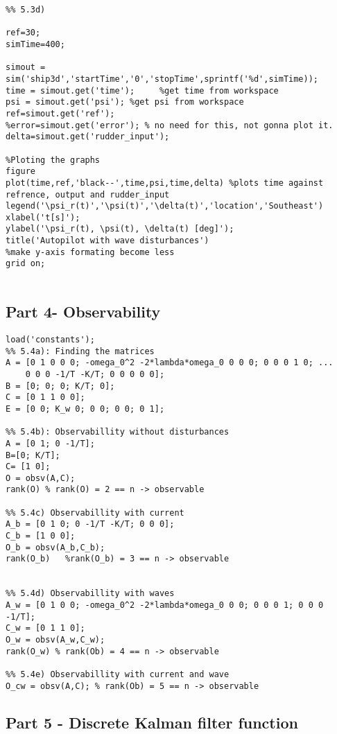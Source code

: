 \begin{lstlisting}
%% 5.3d)

ref=30;
simTime=400; 

simout = sim('ship3d','startTime','0','stopTime',sprintf('%d',simTime));
time = simout.get('time');     %get time from workspace
psi = simout.get('psi'); %get psi from workspace
ref=simout.get('ref');
%error=simout.get('error'); % no need for this, not gonna plot it.
delta=simout.get('rudder_input');

%Ploting the graphs
figure
plot(time,ref,'black--',time,psi,time,delta) %plots time against refrence, output and rudder_input
legend('\psi_r(t)','\psi(t)','\delta(t)','location','Southeast')
xlabel('t[s]');
ylabel('\psi_r(t), \psi(t), \delta(t) [deg]'); 
title('Autopilot with wave disturbances')
%make y-axis formating become less
grid on;


\end{lstlisting}

\subsection{Part 4- Observability}
\begin{lstlisting}
load('constants');
%% 5.4a): Finding the matrices
A = [0 1 0 0 0; -omega_0^2 -2*lambda*omega_0 0 0 0; 0 0 0 1 0; ...
    0 0 0 -1/T -K/T; 0 0 0 0 0];
B = [0; 0; 0; K/T; 0];
C = [0 1 1 0 0];
E = [0 0; K_w 0; 0 0; 0 0; 0 1];

%% 5.4b): Observabillity without disturbances
A = [0 1; 0 -1/T];
B=[0; K/T];
C= [1 0];
O = obsv(A,C);
rank(O) % rank(O) = 2 == n -> observable

%% 5.4c) Observabillity with current
A_b = [0 1 0; 0 -1/T -K/T; 0 0 0]; 
C_b = [1 0 0];
O_b = obsv(A_b,C_b);
rank(O_b)   %rank(O_b) = 3 == n -> observable


%% 5.4d) Observabillity with waves 
A_w = [0 1 0 0; -omega_0^2 -2*lambda*omega_0 0 0; 0 0 0 1; 0 0 0 -1/T];
C_w = [0 1 1 0];
O_w = obsv(A_w,C_w);
rank(O_w) % rank(Ob) = 4 == n -> observable

%% 5.4e) Observabillity with current and wave
O_cw = obsv(A,C); % rank(Ob) = 5 == n -> observable

\end{lstlisting}


\subsection{Part 5 - Discrete Kalman filter function}

